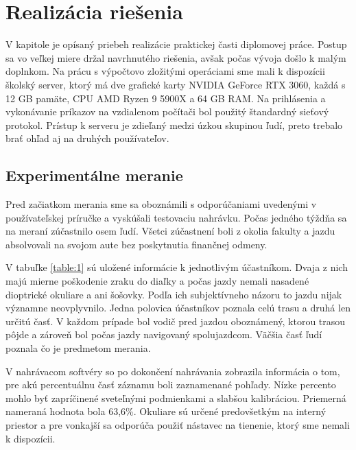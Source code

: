 \chapter{Realizácia riešenia}\label{chap:research}

V kapitole je opísaný priebeh realizácie praktickej časti diplomovej práce. Postup sa vo veľkej miere držal navrhnutého riešenia, avšak počas vývoja došlo k malým doplnkom. Na prácu s výpočtovo zložitými operáciami sme mali k dispozícii školský server, ktorý má dve grafické karty NVIDIA GeForce RTX 3060, každá s 12 GB pamäte, CPU AMD Ryzen 9 5900X a 64 GB RAM. Na prihlásenia a vykonávanie príkazov na vzdialenom počítači bol použitý štandardný sieťový protokol. Prístup k serveru je zdieľaný medzi úzkou skupinou ľudí, preto trebalo brať ohľad aj na druhých používateľov.

\section{Experimentálne meranie}

Pred začiatkom merania sme sa oboznámili s odporúčaniami uvedenými v používateľskej príručke a vyskúšali testovaciu nahrávku. Počas jedného týždňa sa na meraní zúčastnilo osem ľudí. Všetci zúčastnení boli z okolia fakulty a jazdu absolvovali na svojom aute bez poskytnutia finančnej odmeny. 

V tabuľke \ref{table:1} sú uložené informácie k jednotlivým účastníkom. Dvaja z nich majú mierne poškodenie zraku do diaľky a počas jazdy nemali nasadené dioptrické okuliare a ani šošovky. Podľa ich subjektívneho názoru to jazdu nijak významne neovplyvnilo. Jedna polovica účastníkov poznala celú trasu a druhá len určitú časť. V každom prípade bol vodič pred jazdou oboznámený, ktorou trasou pôjde a zároveň bol počas jazdy navigovaný spolujazdcom. Väčšia časť ľudí poznala čo je predmetom merania. 

V nahrávacom softvéry so po dokončení nahrávania zobrazila informácia o tom, pre akú percentuálnu časť záznamu boli zaznamenané pohľady. Nízke percento mohlo byť zapríčinené sveteľnými podmienkami a slabšou kalibráciou. Priemerná nameraná hodnota bola 63,6\%. Okuliare sú určené predovšetkým na interný priestor a pre vonkajší sa odporúča použiť nástavec na tienenie, ktorý sme nemali k dispozícii.


